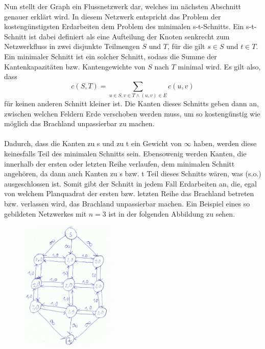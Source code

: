 \documentclass[a4paper, notitlepage, 12pt]{scrartcl}
\begin{document}
Nun stellt der Graph ein Flussnetzwerk dar, welches im nächsten Abschnitt genauer erklärt wird. In diesem Netzwerk entspricht das Problem der kostengünstigsten Erdarbeiten dem Problem des minimalen s-t-Schnitts. Ein s-t-Schnitt ist dabei definiert als eine Aufteilung der Knoten senkrecht zum Netzwerkfluss in zwei disjunkte Teilmengen $S$ und $T$, für die gilt $s\in S$ und $t\in T$. Ein minimaler Schnitt ist ein solcher Schnitt, sodass die Summe der Kantenkapazitäten bzw. Kantengewichte von $S$ nach $T$ minimal wird. Es gilt also, dass \begin{equation}c(S,T) = \sum_{u \in S, v \in T \wedge (u,v) \in E} c(u,v)\end{equation} für keinen anderen Schnitt kleiner ist. \cite{Src:tre} Die Kanten dieses Schnitts geben dann an, zwischen welchen Feldern Erde verschoben werden muss, um so kostengünstig wie möglich das Brachland unpassierbar zu machen. \\ \\ 
Dadurch, dass die Kanten zu s und zu t ein Gewicht von $\infty$ haben, werden diese keinesfalls Teil des minimalen Schnitts sein. Ebensowenig werden Kanten, die innerhalb der ersten oder letzten Reihe verlaufen, dem minimalen Schnitt angehören, da dann auch Kanten zu s bzw. t Teil dieses Schnitts wären, was (s.o.) ausgeschlossen ist. Somit gibt der Schnitt in jedem Fall Erdarbeiten an, die, egal von welchem Planquadrat der ersten bzw. letzten Reihe das Brachland betreten bzw. verlassen wird, das Brachland unpassierbar machen. Ein Beispiel eines so gebildeten Netzwerkes mit $n=3$ ist in der folgenden Abbildung zu sehen.
\begin{figure}[H]
\centering \includegraphics[width=0.4\textwidth]{pics/ill-graph.png}
\end{figure}
\end{document}
